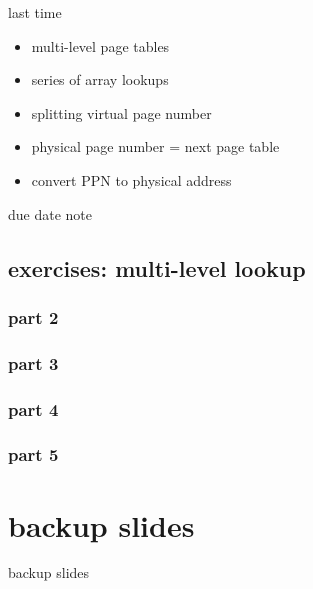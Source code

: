 \date{}
\title{}
\date{}

\begin{frame}
    \titlepage
\end{frame}




\begin{frame}{last time}
    \begin{itemize}
    \item multi-level page tables
    \item series of array lookups
    \item splitting virtual page number
    \item physical page number = next page table
    \item convert PPN to physical address
    \end{itemize}
\end{frame}

\begin{frame}{due date note}
\end{frame}

\subsection{exercises: multi-level lookup}
\subsubsection{part 2}

\subsubsection{part 3}


\subsubsection{part 4}

\subsubsection{part 5}



\section{backup slides}
\begin{frame}{backup slides}
\end{frame}



